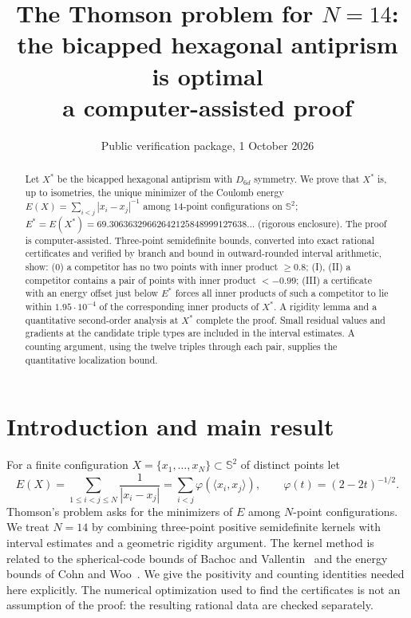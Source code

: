 \documentclass[11pt]{article}
\title{The Thomson problem for $N=14$:\\ the bicapped hexagonal antiprism is optimal\\[0.3em]
\large a computer-assisted proof}
\author{}
\date{Public verification package, 1 October 2026}
\theoremstyle{definition}
\newcommand{\Sph}{\mathbb{S}^2}
\newcommand{\ip}[2]{\langle #1,#2\rangle}
\newcommand{\Xs}{X^{\ast}}
\newcommand{\Es}{E^{\ast}}
\newcommand{\TUBE}{1.95\cdot10^{-4}}        %
\begin{document}
\maketitle

\begin{abstract}
Let $\Xs$ be the bicapped hexagonal antiprism with $D_{6d}$ symmetry. We prove that $\Xs$ is, up to isometries, the unique
minimizer of the Coulomb energy $E(X)=\sum_{i<j}|x_i-x_j|^{-1}$ among $14$-point configurations on $\Sph$;
$\Es=E(\Xs)=69.30636329662642125848999127638\ldots$ (rigorous enclosure).
The proof is computer-assisted. Three-point semidefinite bounds, converted into exact rational certificates and verified by
branch and bound in outward-rounded interval arithmetic, show: (0) a competitor has no two points with inner product
$\ge0.8$; (I), (II) a competitor contains a pair of points with inner product $<-0.99$; (III) a certificate with an
energy offset just below $\Es$ forces all inner products of such a competitor to lie within $\TUBE$ of
the corresponding inner products of $\Xs$. A rigidity lemma and a quantitative second-order analysis at $\Xs$ complete the
proof.
Small residual values and gradients at the candidate triple types are included in the interval estimates.
A counting argument, using the twelve triples through each pair, supplies the quantitative localization bound.
\end{abstract}


\section{Introduction and main result}

For a finite configuration $X=\{x_1,\dots,x_N\}\subset\Sph$ of distinct points let
\[
  E(X)=\sum_{1\le i<j\le N}\frac{1}{|x_i-x_j|}=\sum_{i<j}\varphi(\ip{x_i}{x_j}),\qquad \varphi(t)=(2-2t)^{-1/2}.
\]
Thomson's problem asks for the minimizers of $E$ among $N$-point configurations. We treat $N=14$ by combining
three-point positive semidefinite kernels with interval estimates and a geometric rigidity argument.
The kernel method is related to the spherical-code bounds of Bachoc and Vallentin~\cite{BV} and the energy bounds of
Cohn and Woo~\cite{CohnWoo}. We give the positivity and counting identities needed here explicitly.
The numerical optimization used to find the certificates is not an assumption of the proof: the resulting rational
data are checked separately.
\end{document}

